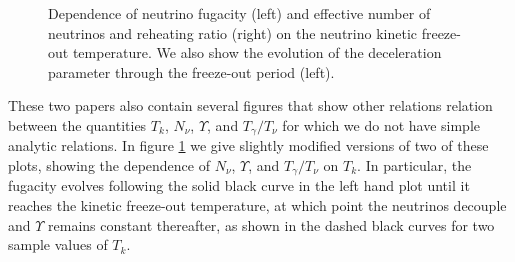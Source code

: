 \begin{figure}\label{fig:Tk_dependence}
\begin{minipage}{\linewidth}
\caption{Dependence of neutrino fugacity (left) and effective number of neutrinos and reheating ratio (right) on the neutrino kinetic freeze-out temperature. We also show the evolution of the deceleration parameter through the freeze-out period (left).}
\end{minipage}
 \end{figure}


These two papers also contain several figures that show other relations relation between the quantities $T_k$, $N_\nu$, $\Upsilon$, and $T_\gamma/T_\nu$ for which we do not have simple analytic relations. In figure \ref{fig:Tk_dependence} we give slightly modified versions of two of these plots, showing the dependence of $N_\nu$, $\Upsilon$, and $T_\gamma/T_\nu$ on $T_k$.  In particular, the fugacity evolves following the solid black curve in the left hand plot until it reaches the kinetic freeze-out temperature, at which point the neutrinos decouple and $\Upsilon$ remains constant thereafter, as shown in the dashed black curves for two sample values of $T_k$.

